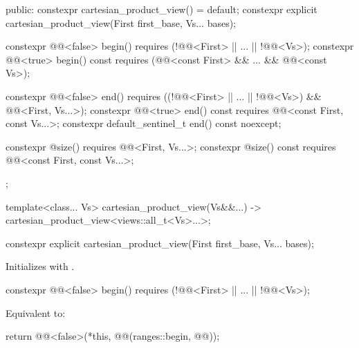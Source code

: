 \begin{codeblock}
{{  public:
    constexpr cartesian_product_view() = default;
    constexpr explicit cartesian_product_view(First first_base, Vs... bases);

    constexpr @@<false> begin()
      requires (!@@<First> || ... || !@@<Vs>);
    constexpr @@<true> begin() const
      requires (@@<const First> && ... && @@<const Vs>);

    constexpr @@<false> end()
      requires ((!@@<First> || ... || !@@<Vs>) &&
        @@<First, Vs...>);
    constexpr @@<true> end() const
      requires @@<const First, const Vs...>;
    constexpr default_sentinel_t end() const noexcept;

    constexpr @\seebelow@ size()
      requires @@<First, Vs...>;
    constexpr @\seebelow@ size() const
      requires @@<const First, const Vs...>;
  };

  template<class... Vs>
    cartesian_product_view(Vs&&...) -> cartesian_product_view<views::all_t<Vs>...>;
}
\end{codeblock}

\begin{itemdecl}
constexpr explicit cartesian_product_view(First first_base, Vs... bases);
\end{itemdecl}

\begin{itemdescr}
\pnum
\effects
Initializes 
with .
\end{itemdescr}

\begin{itemdecl}
constexpr @@<false> begin()
  requires (!@@<First> || ... || !@@<Vs>);
\end{itemdecl}

\begin{itemdescr}
\pnum
\effects
Equivalent to:
\begin{codeblock}
return @@<false>(*this, @@(ranges::begin, @@));
\end{codeblock}
\end{itemdescr}

